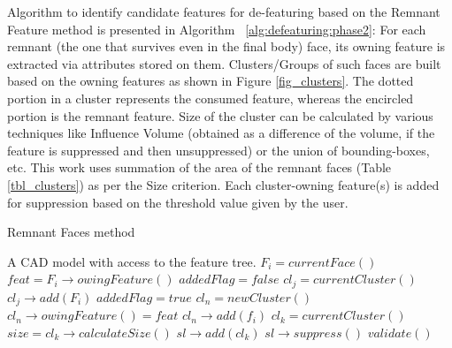 Algorithm to identify candidate features for de-featuring based on the Remnant Feature method is presented in Algorithm ~\ref{alg:defeaturing:phase2}:
For each remnant (the one that survives even in the final body) face, its owning feature is extracted via attributes stored on them. Clusters/Groups of such faces are built based on the owning features as shown in Figure  \ref{fig_clusters}. The dotted portion in a cluster represents the consumed feature, whereas the encircled portion is the remnant feature. Size of the cluster can be calculated by various techniques like Influence Volume (obtained as a difference of the volume, if the feature is suppressed and then unsuppressed) or the union of bounding-boxes, etc. This work uses summation of the area of the remnant faces (Table \ref{tbl_clusters}) as per the Size criterion. Each cluster-owning feature(s) is added for suppression based on the threshold value given by the user.

\begin{algorithm}[!tbh]
	\caption{Remnant Faces method}
	\label{alg:defeaturing:phase2}
	\begin{algorithmic}
		\REQUIRE A CAD model with access to the feature tree. 
			\STATE $F_i = currentFace()$
			\STATE $feat = F_i \rightarrow owingFeature()$
			\STATE $addedFlag = false$
				\STATE $cl_j = currentCluster()$
					\STATE  $cl_j \rightarrow add(F_i)$
					\STATE $addedFlag = true$
				\ENDIF
			\ENDWHILE
				\STATE  $cl_n = newCluster()$
				\STATE  $cl_n \rightarrow owingFeature() = feat$
				\STATE  $cl_n \rightarrow add(f_i)$
			\ENDIF
		\ENDWHILE
			\STATE $cl_k = currentCluster()$
			\STATE $size = cl_k \rightarrow calculateSize()$
				\STATE   $sl \rightarrow add(cl_k)$
			\ENDIF			
		\ENDWHILE
		\STATE  $sl \rightarrow suppress()$
		\STATE  $validate()$
	\end{algorithmic}
\end{algorithm}

